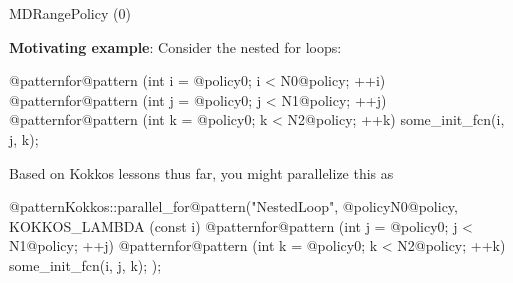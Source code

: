 \begin{frame}[fragile]{MDRangePolicy (0)}

  \textbf{Motivating example}: Consider the nested for loops:






  \begin{code}[linebackgroundcolor={
        \btLstHL<1->{5}{bodyColor}
      },
      frame=single
    ]

@patternfor@pattern (int i = @policy0; i < N0@policy; ++i)
  @patternfor@pattern (int j = @policy0; j < N1@policy; ++j)
    @patternfor@pattern (int k = @policy0; k < N2@policy; ++k)
      some_init_fcn(i, j, k);

  \end{code}



  {Based on Kokkos lessons thus far, you might parallelize this as}

  \pause


  \begin{code}[linebackgroundcolor={
        \btLstHL<1->{5}{bodyColor}
      },
      frame=single
    ]
@patternKokkos::parallel_for@pattern("NestedLoop", @policyN0@policy,
                     KOKKOS_LAMBDA (const i) {
                       @patternfor@pattern (int j = @policy0; j < N1@policy; ++j)
                         @patternfor@pattern (int k = @policy0; k < N2@policy; ++k)
                           some_init_fcn(i, j, k);
                     }
                    );
  \end{code}


\end{frame}
